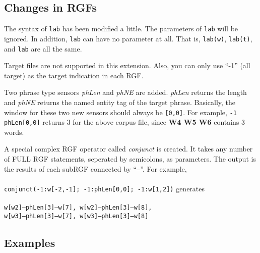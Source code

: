 \documentclass[11pt]{article}
\begin{document}
\subsection*{Changes in RGFs}

The syntax of {\tt lab} has been modified a little.  The parameters of {\tt lab}
will be ignored.  In addition, {\tt lab} can have no parameter at all.
That is, {\tt lab(w)}, {\tt lab(t)}, and {\tt lab} are all the same.

Target files are not supported in this extension.  Also, you can only use 
``-1'' (all target) as the target indication in each RGF.

Two phrase type sensors {\em phLen} and {\em phNE} are added.  {\em phLen} 
returns the length and {\em phNE} returns the named entity tag of the target 
phrase.  Basically, the window for these two new sensors should always be 
{\tt [0,0]}.  For example, 
{\tt -1 phLen[0,0]} returns 3 for the above corpus file, since {\bf W4 W5 W6} 
contains 3 words.

A special complex RGF operator called {\em conjunct} is created.  It takes any 
number of FULL RGF statements, seperated by semicolons, as parameters.  The 
output is the results of each subRGF connected by ``--''.  For example, \\ \\
%
{\tt conjunct(-1:w[-2,-1]; -1:phLen[0,0]; -1:w[1,2])} generates \\ \\
%
{\tt w[w2]--phLen[3]--w[7], w[w2]--phLen[3]--w[8], \\
w[w3]--phLen[3]--w[7], w[w3]--phLen[3]--w[8]}


\subsection*{Examples}
\end{document}
